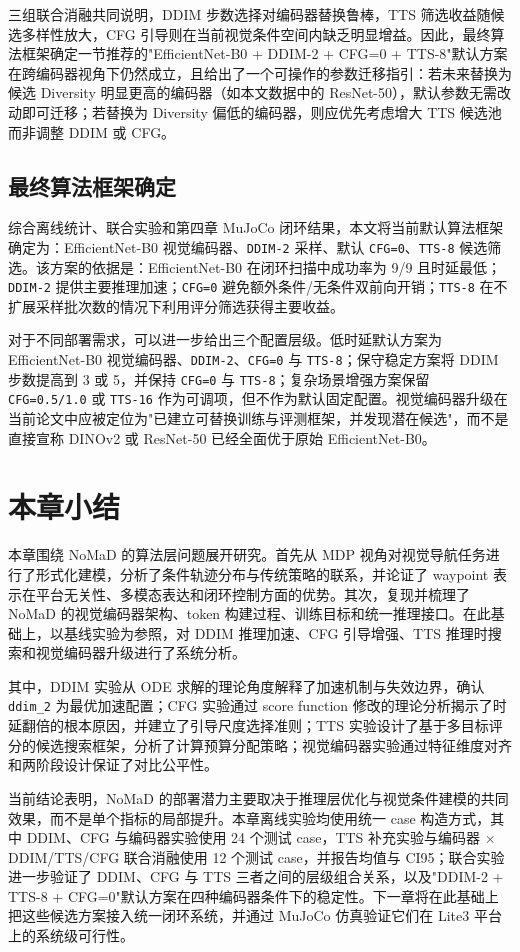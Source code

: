 三组联合消融共同说明，DDIM 步数选择对编码器替换鲁棒，TTS 筛选收益随候选多样性放大，CFG 引导则在当前视觉条件空间内缺乏明显增益。因此，最终算法框架确定一节推荐的"EfficientNet-B0 + DDIM-2 + CFG=0 + TTS-8"默认方案在跨编码器视角下仍然成立，且给出了一个可操作的参数迁移指引：若未来替换为候选 Diversity 明显更高的编码器（如本文数据中的 ResNet-50），默认参数无需改动即可迁移；若替换为 Diversity 偏低的编码器，则应优先考虑增大 TTS 候选池而非调整 DDIM 或 CFG。

\subsection{最终算法框架确定}

综合离线统计、联合实验和第四章 MuJoCo 闭环结果，本文将当前默认算法框架确定为：EfficientNet-B0 视觉编码器、\texttt{DDIM-2} 采样、默认 \texttt{CFG=0}、\texttt{TTS-8} 候选筛选。该方案的依据是：EfficientNet-B0 在闭环扫描中成功率为 9/9 且时延最低；\texttt{DDIM-2} 提供主要推理加速；\texttt{CFG=0} 避免额外条件/无条件双前向开销；\texttt{TTS-8} 在不扩展采样批次数的情况下利用评分筛选获得主要收益。

对于不同部署需求，可以进一步给出三个配置层级。低时延默认方案为 EfficientNet-B0 视觉编码器、\texttt{DDIM-2}、\texttt{CFG=0} 与 \texttt{TTS-8}；保守稳定方案将 DDIM 步数提高到 3 或 5，并保持 \texttt{CFG=0} 与 \texttt{TTS-8}；复杂场景增强方案保留 \texttt{CFG=0.5/1.0} 或 \texttt{TTS-16} 作为可调项，但不作为默认固定配置。视觉编码器升级在当前论文中应被定位为"已建立可替换训练与评测框架，并发现潜在候选"，而不是直接宣称 DINOv2 或 ResNet-50 已经全面优于原始 EfficientNet-B0。

\section{本章小结}

本章围绕 NoMaD 的算法层问题展开研究。首先从 MDP 视角对视觉导航任务进行了形式化建模，分析了条件轨迹分布与传统策略的联系，并论证了 waypoint 表示在平台无关性、多模态表达和闭环控制方面的优势。其次，复现并梳理了 NoMaD 的视觉编码器架构、token 构建过程、训练目标和统一推理接口。在此基础上，以基线实验为参照，对 DDIM 推理加速、CFG 引导增强、TTS 推理时搜索和视觉编码器升级进行了系统分析。

其中，DDIM 实验从 ODE 求解的理论角度解释了加速机制与失效边界，确认 \texttt{ddim\_2} 为最优加速配置；CFG 实验通过 score function 修改的理论分析揭示了时延翻倍的根本原因，并建立了引导尺度选择准则；TTS 实验设计了基于多目标评分的候选搜索框架，分析了计算预算分配策略；视觉编码器实验通过特征维度对齐和两阶段设计保证了对比公平性。

当前结论表明，NoMaD 的部署潜力主要取决于推理层优化与视觉条件建模的共同效果，而不是单个指标的局部提升。本章离线实验均使用统一 case 构造方式，其中 DDIM、CFG 与编码器实验使用 24 个测试 case，TTS 补充实验与编码器 $\times$ DDIM/TTS/CFG 联合消融使用 12 个测试 case，并报告均值与 CI95；联合实验进一步验证了 DDIM、CFG 与 TTS 三者之间的层级组合关系，以及"DDIM-2 + TTS-8 + CFG=0"默认方案在四种编码器条件下的稳定性。下一章将在此基础上把这些候选方案接入统一闭环系统，并通过 MuJoCo 仿真验证它们在 Lite3 平台上的系统级可行性。
